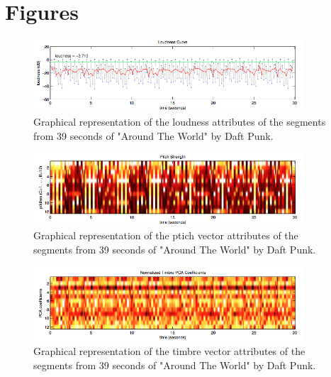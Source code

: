 \section{Figures} %
\label{sec:list_of_figures}


\begin{figure}[h]
    \centering
    \includegraphics[width=0.9\textwidth]{figures/loudness.jpg}
    \caption{Graphical representation of the loudness attributes of the segments from 39 seconds of "Around The World" by Daft Punk.}
    \label{fig:loudness}
\end{figure}

\begin{figure}[h]
    \centering
    \includegraphics[width=0.9\textwidth]{figures/pitch.jpg}
    \caption{Graphical representation of the ptich vector attributes of the segments from 39 seconds of "Around The World" by Daft Punk.}
    \label{fig:pitch}
\end{figure}

\begin{figure}[h]
    \centering
    \includegraphics[width=0.9\textwidth]{figures/timbre.jpg}
    \caption{Graphical representation of the timbre vector attributes of the segments from 39 seconds of "Around The World" by Daft Punk.}
    \label{fig:timbre}
\end{figure}


\newpage

